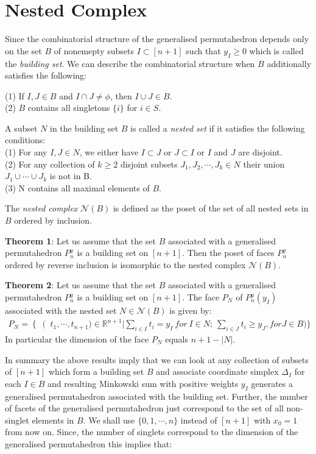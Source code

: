 \documentclass[hidelinks,12pt]{article}
\newcommand{\bea}[1]{\begin{eqnarray}\label{#1} }
\newcommand{\eea}{\end{eqnarray}}
\def\bea{\begin{eqnarray}}
\def\eea{\end{eqnarray}}
\begin{document}
\section*{Nested Complex}
Since the combinatorial structure of the generalised permutahedron depends only on the set $B$ of nonemepty subsets $I \subset [n+1]$ such that $y_I \geq 0$ which is called the {\it building set}. We can describe the combinatorial structure when $B$ additionally satisfies the following:

\noindent(1) If $I,J \in B$ and $I \cap J \neq \phi $, then $I \cup J \in B$. \\
(2) $B$ contains all singletons $\{ i\}$ for $i \in S$.

A subset $N$ in the building set $B$ is called a {\it nested set} if it satisfies the following conditions:\\
\noindent
(1) For any $I,J \in N$, we either have $I \subset J$ or $J\subset I$ or $I$ and $J$ are disjoint.\\
(2) For any collection of $k \geq 2$ disjoint subsets $J_1,J_2,\cdots, J_k \in N$ their union $J_1 \cup \cdots \cup J_k$ is not in B. \\
(3) N contains all maximal elements of $B$.

The {\it nested complex} $\mathcal{N}(B)$ is defined as the poset of the set of all nested sets in $B$ ordered by inclusion.

{\bf Theorem 1}: Let us assume that the set $B$ associated with a generalised permutahedron $P_n^{y}$ is a building set on $[n+1]$. Then the poset of faces $P_n^{y}$ ordered by reverse inclusion is isomorphic to the nested complex $\mathcal{N}(B)$. 

{\bf Theorem 2}: Let us assume that the set $B$ associated with a generalised permutahedron $P_n^{y}$ is a building set on $[n+1]$. The face $P_N$ of $P_n^{y}(y_I)$ associated with the nested set $N \in \mathcal{N}(B)$ is given by:
\bea
P_N = \left \{ \right (t_1,\cdots,t_{n+1}) \in \mathbb{R}^{n+1} | \sum_{i \in I} t_i =y_{I}~for~I \in N; ~ \sum_{i \in J}t_i \geq y_J, for J \in B  )\}
\eea
In particular the dimension of the face $P_N$ equals $n+1-|N|$. 

In summary the above results imply that we can look at any collection of subsets of $[n+1]$ which form a building set $B$ and associate  coordinate simplex $\Delta_I$ for each $I \in B$ and resulting Minkowski sum with positive weights $y_I$ generates a generalised permutahedron associated with the building set. Further, the number of facets of the generalised permutahedron just correspond to the set of all non-singlet elements in $B$.  
We shall use $ \{0,1,\cdots,n \}$ instead of $[n+1]$ with $x_0 =1$ from now on. Since, the number of singlets correspond to the dimension of the generalised permutahedron this implies that:
\end{document}
